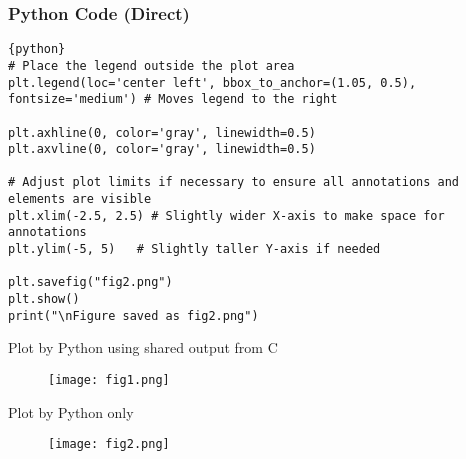 \documentclass{beamer}
\begin{document}
\begin{frame}[fragile]
\frametitle{Python Code (Direct)}
\begin{lstlisting}{python}
# Place the legend outside the plot area
plt.legend(loc='center left', bbox_to_anchor=(1.05, 0.5), fontsize='medium') # Moves legend to the right

plt.axhline(0, color='gray', linewidth=0.5)
plt.axvline(0, color='gray', linewidth=0.5)

# Adjust plot limits if necessary to ensure all annotations and elements are visible
plt.xlim(-2.5, 2.5) # Slightly wider X-axis to make space for annotations
plt.ylim(-5, 5)   # Slightly taller Y-axis if needed

plt.savefig("fig2.png")
plt.show()
print("\nFigure saved as fig2.png")
\end{lstlisting}
\end{frame}

\begin{frame}{Plot by Python using shared output from C}
\begin{figure}[H]
\centering
\texttt{[image: fig1.png]}
\caption{}
\label{fig:1}
\end{figure}
\end{frame}

\begin{frame}{Plot by Python only}
\begin{figure}[H]
\centering
\texttt{[image: fig2.png]}
\caption{}
\label{fig:2}
\end{figure}
\end{frame}
\end{document}
